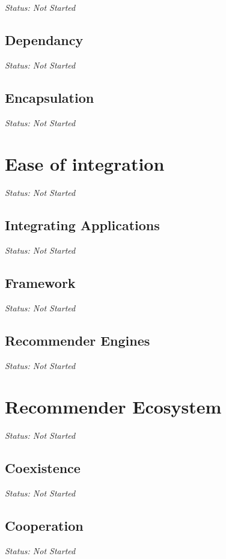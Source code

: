 \emph{Status: Not Started}

\subsection{Dependancy}

\emph{Status: Not Started}

\subsection{Encapsulation}

\emph{Status: Not Started}

\section{Ease of integration}

\emph{Status: Not Started}

\subsection{Integrating Applications}

\emph{Status: Not Started}

\subsection{Framework}

\emph{Status: Not Started}

\subsection{Recommender Engines}

\emph{Status: Not Started}

\section{Recommender Ecosystem}

\emph{Status: Not Started}

\subsection{Coexistence}

\emph{Status: Not Started}

\subsection{Cooperation}

\emph{Status: Not Started}